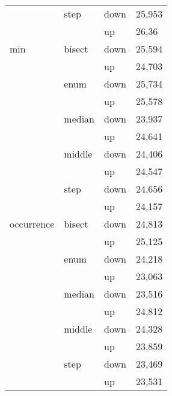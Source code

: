 \begin{longtable}{llll}
          & \multicolumn{1}{l}{step} & down  & 25,953 \\
          &       & up    & 26,36 \\ \hline
    \multicolumn{1}{l}{min} & \multicolumn{1}{l}{bisect} & down  & 25,594 \\
          &       & up    & 24,703 \\
          & \multicolumn{1}{l}{enum} & down  & 25,734 \\
          &       & up    & 25,578 \\
          & \multicolumn{1}{l}{median} & down  & 23,937 \\
          &       & up    & 24,641 \\
          & \multicolumn{1}{l}{middle} & down  & 24,406 \\
          &       & up    & 24,547 \\
          & \multicolumn{1}{l}{step} & down  & 24,656 \\
          &       & up    & 24,157 \\ \hline
    \multicolumn{1}{l}{occurrence} & \multicolumn{1}{l}{bisect} & down  & 24,813 \\
          &       & up    & 25,125 \\
          & \multicolumn{1}{l}{enum} & down  & 24,218 \\
          &       & up    & 23,063 \\
          & \multicolumn{1}{l}{median} & down  & 23,516 \\
          &       & up    & 24,812 \\
          & \multicolumn{1}{l}{middle} & down  & 24,328 \\
          &       & up    & 23,859 \\
          & \multicolumn{1}{l}{step} & down  & 23,469 \\
          &       & up    & 23,531 \\ 
\end{longtable}
